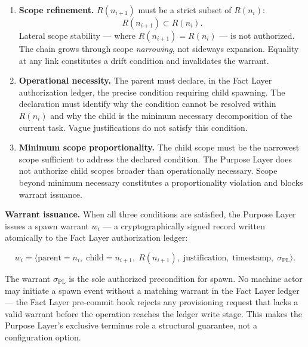 \begin{enumerate}
    \item[(P1)] \textbf{Scope refinement.} $R(n_{i+1})$ must be a strict subset of $R(n_i)$:
    \begin{equation}
    R(n_{i+1}) \subset R(n_i).
    \label{eq:rs-scope-refinement}
    \end{equation}
    Lateral scope stability — where $R(n_{i+1}) = R(n_i)$ — is not authorized. The chain grows through scope \emph{narrowing}, not sideways expansion. Equality at any link constitutes a drift condition and invalidates the warrant.

    \item[(P2)] \textbf{Operational necessity.} The parent must declare, in the Fact Layer authorization ledger, the precise condition requiring child spawning. The declaration must identify why the condition cannot be resolved within $R(n_i)$ and why the child is the minimum necessary decomposition of the current task. Vague justifications do not satisfy this condition.

    \item[(P3)] \textbf{Minimum scope proportionality.} The child scope must be the narrowest scope sufficient to address the declared condition. The Purpose Layer does not authorize child scopes broader than operationally necessary. Scope beyond minimum necessary constitutes a proportionality violation and blocks warrant issuance.
\end{enumerate}

\medskip
\noindent\textbf{Warrant issuance.} When all three conditions are satisfied, the Purpose Layer issues a spawn warrant $w_i$ — a cryptographically signed record written atomically to the Fact Layer authorization ledger:

\begin{equation}
w_i = \bigl\langle
\text{parent}=n_i,\;
\text{child}=n_{i+1},\;
R(n_{i+1}),\;
\text{justification},\;
\text{timestamp},\;
\sigma_{\text{PL}}
\bigr\rangle .
\label{eq:rs-warrant}
\end{equation}

The warrant $\sigma_{\text{PL}}$ is the sole authorized precondition for spawn. No machine actor may initiate a spawn event without a matching warrant in the Fact Layer ledger — the Fact Layer pre-commit hook rejects any provisioning request that lacks a valid warrant before the operation reaches the ledger write stage. This makes the Purpose Layer's exclusive terminus role a structural guarantee, not a configuration option.

